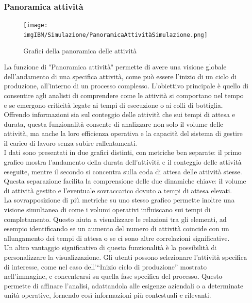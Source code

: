 \documentclass{article}
\begin{document}
\subsubsection{Panoramica attività}
 \begin{figure}[H]
    \centering
    \texttt{[image: imgIBM/Simulazione/PanoramicaAttivitàSimulazione.png]}
    \caption{Grafici della panoramica delle attività}
    \label{fig:activity-overview-graphs}
\end{figure}
La funzione di "Panoramica attività" permette di avere una visione globale dell'andamento di una specifica attività, come può essere l'inizio di un ciclo di produzione, all'interno di un processo complesso. L'obiettivo principale è quello di consentire agli analisti di comprendere come le attività si comportano nel tempo e se emergono criticità legate ai tempi di esecuzione o ai colli di bottiglia.\\
Offrendo informazioni sia sul conteggio delle attività che sui tempi di attesa e durata, questa funzionalità consente di analizzare non solo il volume delle attività, ma anche la loro efficienza operativa e la capacità del sistema di gestire il carico di lavoro senza subire rallentamenti.\\
I dati sono presentati in due grafici distinti, con metriche ben separate: il primo grafico mostra l'andamento della durata dell'attività e il conteggio delle attività eseguite, mentre il secondo si concentra sulla coda di attesa delle attività stesse. Questa separazione facilita la comprensione delle due dinamiche chiave: il volume di attività gestito e l'eventuale sovraccarico dovuto a tempi di attesa elevati.\\
La sovrapposizione di più metriche su uno stesso grafico permette inoltre una visione simultanea di come i volumi operativi influiscano sui tempi di completamento. Questo aiuta a visualizzare le relazioni tra gli elementi, ad esempio identificando se un aumento del numero di attività coincide con un allungamento dei tempi di attesa o se ci sono altre correlazioni significative.\\
Un altro vantaggio significativo di questa funzionalità è la possibilità di personalizzare la visualizzazione. Gli utenti possono selezionare l’attività specifica di interesse, come nel caso dell'“Inizio ciclo di produzione” mostrato nell'immagine, e concentrarsi su quella fase specifica del processo. Questo permette di affinare l'analisi, adattandola alle esigenze aziendali o a determinate unità operative, fornendo così informazioni più contestuali e rilevanti.\\
\end{document}
